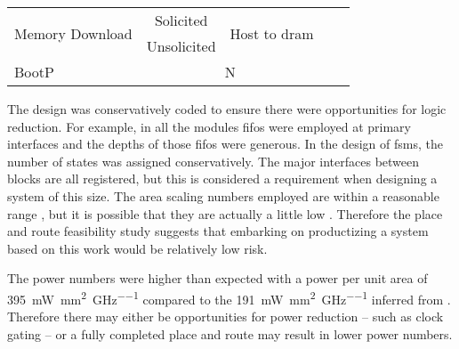 \begin{table}[h]
\begin{minipage}{1\textwidth}
\begin{tabular}{ |m{4cm}|c|c|c|m{3cm}|}
 \multirow{2}{*}{Memory Download}       &   Solicited   & \multirow{2}{*}{Host to \ac{dram}} &                         &                                                                        \\\cline{2-2}
                                        &   Unsolicited &                                    &                         &                                                                        \\\cline{1-3}
        BootP                           &   \multicolumn{2}{c|}{N}                           &                         &                                                                        \\\cline{1-5}
          \end{tabular}
  \end{minipage}
  \captionsetup{justification=centering, skip=9pt}
  \vspace{0.0cm}
  \label{tab:Features implemented}
\end{table}

The design was conservatively coded to ensure there were opportunities for logic reduction. For example, in all the modules \acp{fifo} were employed at primary interfaces and the depths of those \acp{fifo} were generous.
In the design of \acp{fsm}, the number of states was assigned conservatively.
The major interfaces between blocks are all registered, but this is considered a requirement when designing a system of this size.
The area scaling numbers employed are within a reasonable range \cite{schabel2017energy}, but it is possible that they are actually a little low \cite{schabel2014diss}.
Therefore the place and route feasibility study suggests that embarking on productizing a system based on this work would be relatively low risk.

The power numbers were higher than expected %
with a power per unit area of \SI[per-mode=symbol]{395}{\milli\watt\per\square\milli\meter\per\giga\hertz} compared to the \SI[per-mode=symbol]{191}{\milli\watt\per\square\milli\meter\per\giga\hertz} inferred from \cite{tensorflow2015-whitepaper}.
Therefore there may either be opportunities for power reduction -- such as clock gating -- or a fully completed place and route may result in lower power numbers.
